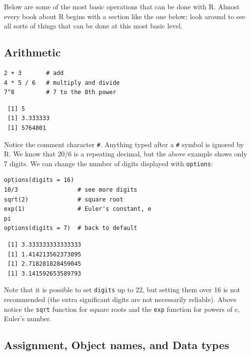 \documentclass[captions=tableheading]{scrbook}
\begin{document}
Below are some of the most basic operations that can be done with \textsf{R}. Almost every book about \textsf{R} begins with a section like the one below; look around to see all sorts of things that can be done at this most basic level.
\subsection{Arithmetic}
\label{sec-2-3-1}

\label{sub:Arithmetic}


\begin{verbatim}
2 + 3       # add
4 * 5 / 6   # multiply and divide
7^8         # 7 to the 8th power
\end{verbatim}

\begin{verbatim}
 [1] 5
 [1] 3.333333
 [1] 5764801
\end{verbatim}

Notice the comment character \texttt{\#}. Anything typed after a \texttt{\#} symbol is ignored by \textsf{R}. We know that \(20/6\) is a repeating decimal, but the above example shows only 7 digits. We can change the number of digits displayed with \texttt{options}:


\begin{verbatim}
options(digits = 16)
10/3                 # see more digits
sqrt(2)              # square root
exp(1)               # Euler's constant, e
pi       
options(digits = 7)  # back to default
\end{verbatim}

\begin{verbatim}
 [1] 3.333333333333333
 [1] 1.414213562373095
 [1] 2.718281828459045
 [1] 3.141592653589793
\end{verbatim}

Note that it is possible to set \texttt{digits} up to 22, but setting them over 16 is not recommended (the extra significant digits are not necessarily reliable). Above notice the \texttt{sqrt} function for square roots and the \texttt{exp} function for powers of \(\mathrm{e}\), Euler's number.
\subsection{Assignment, Object names, and Data types}
\label{sec-2-3-2}

\label{sub:Assignment-Object-names}
\end{document}
